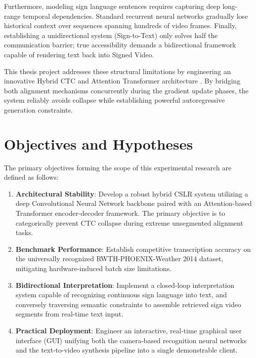 Furthermore, modeling sign language sentences requires capturing deep long-range temporal dependencies. Standard recurrent neural networks gradually lose historical context over sequences spanning hundreds of video frames. Finally, establishing a unidirectional system (Sign-to-Text) only solves half the communication barrier; true accessibility demands a bidirectional framework capable of rendering text back into Signed Video.

This thesis project addresses these structural limitations by engineering an innovative Hybrid CTC and Attention Transformer architecture \cite{watanabe2017hybrid, camgoz2020sign}. By bridging both alignment mechanisms concurrently during the gradient update phases, the system reliably avoids collapse while establishing powerful autoregressive generation constraints.

\section{Objectives and Hypotheses}

The primary objectives forming the scope of this experimental research are defined as follows:
\begin{enumerate}
    \item \textbf{Architectural Stability}: Develop a robust hybrid CSLR system utilizing a deep Convolutional Neural Network backbone paired with an Attention-based Transformer encoder-decoder framework. The primary objective is to categorically prevent CTC collapse during extreme unsegmented alignment tasks.
    \item \textbf{Benchmark Performance}: Establish competitive transcription accuracy on the universally recognized RWTH-PHOENIX-Weather 2014 dataset, mitigating hardware-induced batch size limitations.
    \item \textbf{Bidirectional Interpretation}: Implement a closed-loop interpretation system capable of recognizing continuous sign language into text, and conversely traversing semantic constraints to assemble retrieved sign video segments from real-time text input.
    \item \textbf{Practical Deployment}: Engineer an interactive, real-time graphical user interface (GUI) unifying both the camera-based recognition neural networks and the text-to-video synthesis pipeline into a single demonstrable client.
\end{enumerate}
